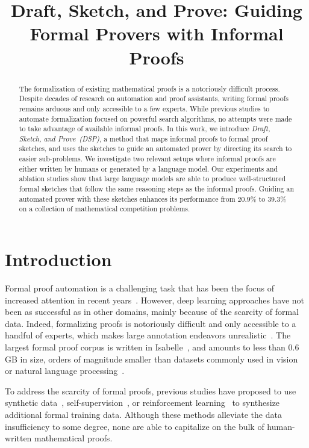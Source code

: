 \title{Draft, Sketch, and Prove: Guiding Formal Provers with Informal Proofs}

\begin{abstract}
The formalization of existing mathematical proofs is a notoriously difficult process. Despite decades of research on automation and proof assistants, writing formal proofs remains arduous and only accessible to a few experts. While previous studies to automate formalization focused on powerful search algorithms, no attempts were made to take advantage of available informal proofs. In this work, we introduce \textit{Draft, Sketch, and Prove~(\textit{DSP})}, a method that maps informal proofs to formal proof sketches, and uses the sketches to guide an automated prover by directing its search to easier sub-problems. We investigate two relevant setups where informal proofs are either written by humans or generated by a language model. Our experiments and ablation studies show that large language models are able to produce well-structured formal sketches that follow the same reasoning steps as the informal proofs. Guiding an automated prover with these sketches enhances its performance from $20.9\%$ to $39.3\%$ on a collection of mathematical competition problems.
\end{abstract}

\section{Introduction}

Formal proof automation is a challenging task that has been the focus of increased attention in recent years~\citep{bansal2019holist, polu2020generative, lample2022hypertree, jiang2022thor, wu2022autoformalization}. However, deep learning approaches have not been as successful as in other domains, mainly because of the scarcity of formal data. Indeed, formalizing proofs is notoriously difficult and only accessible to a handful of experts, which makes large annotation endeavors unrealistic~\citep{wiedijk2008formal}. The largest formal proof corpus is written in Isabelle~\citep{paulson1994isabelle}, and amounts to less than $0.6$ GB in size, orders of magnitude smaller than datasets commonly used in vision~\citep{deng2009imagenet} or natural language processing~\citep{gpt3}.

To address the scarcity of formal proofs, previous studies have proposed to use synthetic data~\citep{wu2021int}, self-supervision~\citep{polu2020generative,pact}, or reinforcement learning~\citep{DBLP:journals/corr/abs-1905-10501,polu2022formal} to synthesize additional formal training data. Although these methods alleviate the data insufficiency to some degree, none are able to capitalize on the bulk of human-written mathematical proofs.


